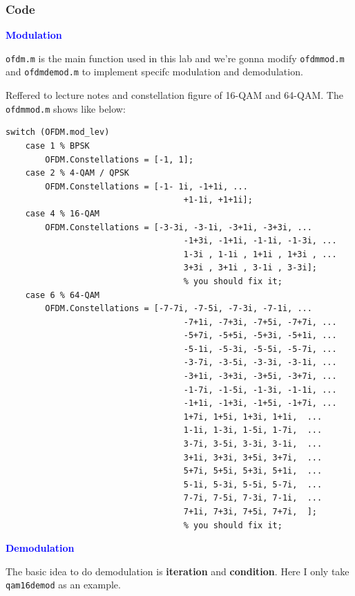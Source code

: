 \documentclass{article}
\begin{document}
\subsubsection{Code}

\textbf{\textcolor{blue}{Modulation}}

\lstinline|ofdm.m| is the main function used in this lab and we're gonna modify \lstinline|ofdmmod.m| and \lstinline|ofdmdemod.m| to implement specifc modulation and demodulation.

Reffered to lecture notes and constellation figure of 16-QAM and 64-QAM. The \lstinline|ofdmmod.m| shows like below:

\begin{lstlisting}
switch (OFDM.mod_lev)
	case 1 % BPSK
		OFDM.Constellations = [-1, 1];
	case 2 % 4-QAM / QPSK
		OFDM.Constellations = [-1- 1i, -1+1i, ...
									+1-1i, +1+1i];
	case 4 % 16-QAM
		OFDM.Constellations = [-3-3i, -3-1i, -3+1i, -3+3i, ...
									-1+3i, -1+1i, -1-1i, -1-3i, ...
									1-3i , 1-1i , 1+1i , 1+3i , ...
									3+3i , 3+1i , 3-1i , 3-3i]; 
									% you should fix it;
	case 6 % 64-QAM
		OFDM.Constellations = [-7-7i, -7-5i, -7-3i, -7-1i, ...
									-7+1i, -7+3i, -7+5i, -7+7i, ...
									-5+7i, -5+5i, -5+3i, -5+1i, ...
									-5-1i, -5-3i, -5-5i, -5-7i, ...
									-3-7i, -3-5i, -3-3i, -3-1i, ...
									-3+1i, -3+3i, -3+5i, -3+7i, ...
									-1-7i, -1-5i, -1-3i, -1-1i, ...
									-1+1i, -1+3i, -1+5i, -1+7i, ...
									1+7i, 1+5i, 1+3i, 1+1i,  ...
									1-1i, 1-3i, 1-5i, 1-7i,  ...
									3-7i, 3-5i, 3-3i, 3-1i,  ...
									3+1i, 3+3i, 3+5i, 3+7i,  ...
									5+7i, 5+5i, 5+3i, 5+1i,  ...
									5-1i, 5-3i, 5-5i, 5-7i,  ...
									7-7i, 7-5i, 7-3i, 7-1i,  ...
									7+1i, 7+3i, 7+5i, 7+7i,  ]; 
									% you should fix it;
\end{lstlisting}

\textbf{\textcolor{blue}{Demodulation}}

The basic idea to do demodulation is  \textbf{iteration} and \textbf{condition}. Here I only take \lstinline|qam16demod| as an example. 
\end{document}
